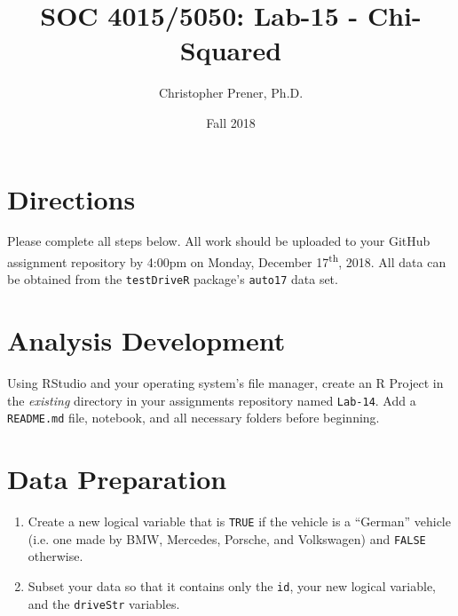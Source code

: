 \documentclass{tufte-handout}
\title{SOC 4015/5050: Lab-15 - Chi-Squared}
\author{Christopher Prener, Ph.D.}
\date{Fall 2018}
\begin{document}

\maketitle %


\vspace{5mm}
\section{Directions}
Please complete all steps below. All work should be uploaded to your GitHub assignment repository by 4:00pm on Monday, December 17\textsuperscript{th}, 2018. All data can be obtained from the \texttt{testDriveR} package's \texttt{auto17} data set.

\vspace{5mm}
\section{Analysis Development}
Using RStudio and your operating system's file manager, create an R Project in the \textit{existing} directory in your assignments repository named \texttt{Lab-14}. Add a \texttt{README.md} file, notebook, and all necessary folders before beginning.

\vspace{5mm}
\section{Data Preparation}
\begin{enumerate}
\item Create a new logical variable that is \texttt{TRUE} if the vehicle is a ``German'' vehicle (i.e. one made by BMW, Mercedes, Porsche, and Volkswagen) and \texttt{FALSE} otherwise.
\item Subset your data so that it contains only the \texttt{id}, your new logical variable, and the \texttt{driveStr} variables.
\end{enumerate}

\vspace{5mm}
\end{document}
